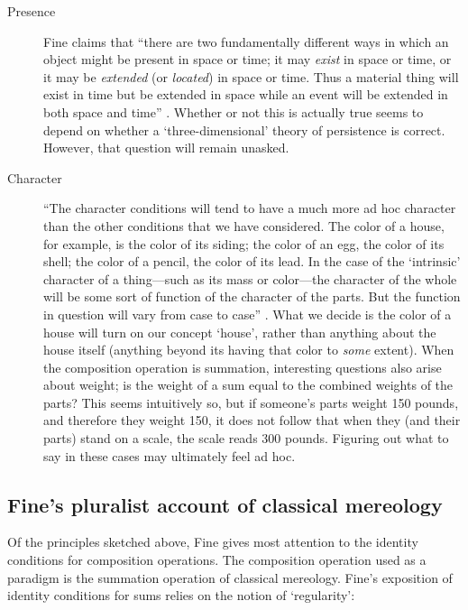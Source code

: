 \documentclass[11pt]{article}
\begin{document}
\begin{spacing}{1.25}
\begin{description}
  \item[Presence] Fine claims that ``there are two fundamentally
    different ways in which an object might be present in space or
    time; it may \emph{exist} in space or time, or it may be
    \emph{extended} (or \emph{located}) in space or time. Thus a
    material thing will exist in time but be extended in space while
    an event will be extended in both space and time''
    \citeyearpar[570]{fine2010}.  Whether or not this is actually true
    seems to depend on whether a `three-dimensional' theory of
    persistence is correct.  However, that question will remain unasked.
  \item[Character] ``The character conditions will tend to have a much
    more ad hoc character than the other conditions that we have
    considered. The color of a house, for example, is the color of its
    siding; the color of an egg, the color of its shell; the color of
    a pencil, the color of its lead. In the case of the `intrinsic'
    character of a thing---such as its mass or color---the character
    of the whole will be some sort of function of the character of the
    parts. But the function in question will vary from case to case''
    \citep[571]{fine2010}.  What we decide is the color of a house
    will turn on our concept `house', rather than anything about the
    house itself (anything beyond its having that color to {\em some}
    extent).  When the composition operation is summation, interesting
    questions also arise about weight; is the weight of a sum equal to
    the combined weights of the parts?  This seems intuitively so, but
    if someone's parts weight 150 pounds, and therefore they weight
    150, it does not follow that when they (and their parts) stand on
    a scale, the scale reads 300 pounds.  Figuring out what to say in
    these cases may ultimately feel ad hoc.
\end{description}

\subsection{Fine's pluralist account of classical mereology}
\label{classical}
Of the principles sketched above, Fine gives most attention to the
identity conditions for composition operations.  The composition
operation used as a paradigm is the summation operation of classical
mereology.  Fine's exposition of identity conditions for sums relies
on the notion of `regularity':


\end{spacing}
\end{document}
